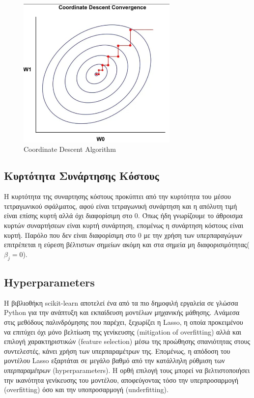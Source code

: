 \documentclass[12pt]{article}
\begin{document}
\begin{figure}
    \centering
    \includegraphics[width=0.7\textwidth]{./images/Coordinate.png}
    \caption{Coordinate Descent Algorithm}
    \label{fig:Coordinate}

\end{figure}

\subsection{Κυρτότητα Συνάρτησης Κόστους}
Η κυρτότητα της συναρτησης κόστους προκύπτει από την κυρτότητα του μέσου τετραγωνικού σφάλματος, αφού είναι τετραγωνική συνάρτηση και η απόλυτη τιμή είναι επίσης κυρτή αλλά όχι διαφορίσιμη στο 0. Όπως ήδη γνωρίζουμε το άθροισμα κυρτών συναρτήσεων είναι κυρτή συνάρτηση, επομένως η συνάρτηση κόστους είναι κυρτή. Παρόλο που δεν είναι διαφορίσιμη στο 0 με την χρήση των υπερπαραγώγων επιτρέπεται η εύρεση βέλτιστων σημείων ακόμη και στα σημεία μη διαφορισιμότητας($\beta_j = 0$).


\subsection{\textlatin{Hyperparameters}}
Η βιβλιοθήκη \textlatin{scikit-learn} αποτελεί ένα από τα πιο δημοφιλή εργαλεία σε γλώσσα Python για την ανάπτυξη και εκπαίδευση μοντέλων μηχανικής μάθησης. Ανάμεσα στις μεθόδους παλινδρόμησης που παρέχει, ξεχωρίζει η \textlatin{Lasso}, η οποία προκειμένου να επιτύχει όχι μόνο βελτίωση της γενίκευσης \textlatin{(mitigation of overfitting)} αλλά και επιλογή χαρακτηριστικών \textlatin{(feature selection)} μέσω της προώθησης σπανιότητας στους συντελεστές, κάνει χρήση των υπερπαραμέτρων της. Επομένως, η απόδοση του μοντέλου \textlatin{Lasso} εξαρτάται σε μεγάλο βαθμό από την κατάλληλη ρύθμιση των \emph{υπερπαραμέτρων} (\textlatin{hyperparameters}). Η ορθή επιλογή τους μπορεί να βελτιστοποιήσει την ικανότητα γενίκευσης του μοντέλου, αποφεύγοντας τόσο την υπερπροσαρμογή \textlatin{(overfitting)} όσο και την υποπροσαρμογή \textlatin{(underfitting)}.
\end{document}
